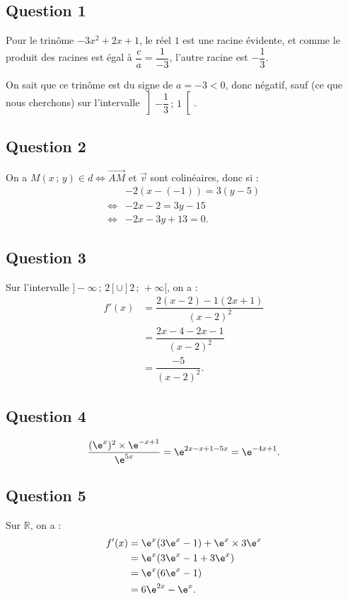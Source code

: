 \subsection*{Question 1}

Pour le trinôme \(-3x^2 + 2x + 1\), le réel \(1\) est une racine évidente, et comme le produit des racines est égal à \(\dfrac{c}{a} = \dfrac{1}{-3}\), l'autre racine est \(-\dfrac{1}{3}\).  

On sait que ce trinôme est du signe de \(a = -3 < 0\), donc négatif, sauf (ce que nous cherchons) sur l'intervalle \(\left]-\dfrac{1}{3}\,;\,1\right[\).

\subsection*{Question 2}

On a \(M(x\,;\,y) \in \textit{d} \iff \overrightarrow{AM}\) et \(\vec{v}\) sont colinéaires, donc si :
\begin{align*}
&-2(x - (-1)) = 3(y - 5) \\
\iff &-2x - 2 = 3y - 15 \\
\iff &-2x - 3y + 13 = 0.
\end{align*}

\subsection*{Question 3}

Sur l'intervalle \(]-\infty\,;\,2[ \cup ]2\,;\,+\infty[\), on a :
\begin{align*}
f'(x) &= \dfrac{2(x - 2) - 1(2x + 1)}{(x - 2)^2} \\
&= \dfrac{2x - 4 - 2x - 1}{(x - 2)^2} \\
&= \dfrac{-5}{(x - 2)^2}.
\end{align*}

\subsection*{Question 4}

\[
\dfrac{(\e^x)^2 \times \e^{-x+1}}{\e^{5x}} = \e^{2x - x + 1 - 5x} = \e^{-4x + 1}.
\]

\subsection*{Question 5}

Sur \(\mathbb{R}\), on a :
\begin{align*}
f'(x) &= \e^x(3\e^x - 1) + \e^x \times 3\e^x \\
&= \e^x(3\e^x - 1 + 3\e^x) \\
&= \e^x(6\e^x - 1) \\
&= 6\e^{2x} - \e^x.
\end{align*}
